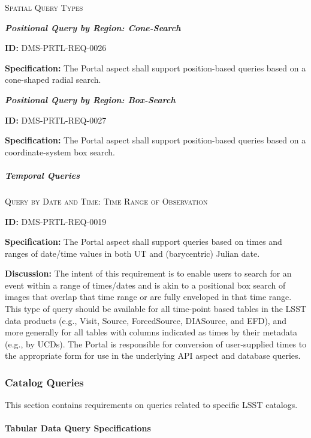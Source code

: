 \documentclass[SE,toc,lsstdraft]{lsstdoc}
\begin{document}
\textsc{Spatial Query Types}

\textbf{\textit{Positional Query by Region: Cone-Search}}

\label{DMS-PRTL-REQ-0026}
\textbf{ID:} DMS-PRTL-REQ-0026

\textbf{Specification:}
The Portal aspect shall support position-based queries based on a cone-shaped radial search.

\textbf{\textit{Positional Query by Region: Box-Search}}

\label{DMS-PRTL-REQ-0027}
\textbf{ID:} DMS-PRTL-REQ-0027

\textbf{Specification:}
The Portal aspect shall support position-based queries based on a coordinate-system box search.

\subparagraph{Temporal Queries}\hfill  %

\textsc{Query by Date and Time: Time Range of Observation}

\label{DMS-PRTL-REQ-0019}
\textbf{ID:} DMS-PRTL-REQ-0019

\textbf{Specification:}
The Portal aspect shall support queries based on times and ranges of date/time values in both UT and (barycentric) Julian date.

\textbf{Discussion:}
The intent of this requirement is to enable users to search for an event within a range of times/dates and is akin to a positional box search of images that overlap that time range or are fully enveloped in that time range.
This type of query should be available for all time-point based tables in the LSST data products (e.g., Visit, Source, ForcedSource, DIASource, and EFD), and more generally for all tables with columns indicated as times by their metadata (e.g., by UCDs).
The Portal is responsible for conversion of user-supplied times to the appropriate form for use in the underlying API aspect and database queries.

\subsubsection{Catalog Queries}

This section contains requirements on queries related to specific LSST catalogs.

\paragraph{Tabular Data Query Specifications}\hfill  %
\end{document}
